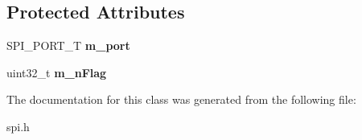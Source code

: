 \subsection*{Protected Attributes}
\begin{DoxyCompactItemize}
\item 
\hypertarget{class_c_s_p_i_a44669f2150e9312a3bd022c000574f81}{S\-P\-I\-\_\-\-P\-O\-R\-T\-\_\-\-T {\bfseries m\-\_\-port}}\label{class_c_s_p_i_a44669f2150e9312a3bd022c000574f81}

\item 
\hypertarget{class_c_s_p_i_a63f794ebd52c8a7402c1327cd84986ed}{uint32\-\_\-t {\bfseries m\-\_\-n\-Flag}}\label{class_c_s_p_i_a63f794ebd52c8a7402c1327cd84986ed}

\end{DoxyCompactItemize}


The documentation for this class was generated from the following file\-:\begin{DoxyCompactItemize}
\item 
spi.\-h\end{DoxyCompactItemize}
